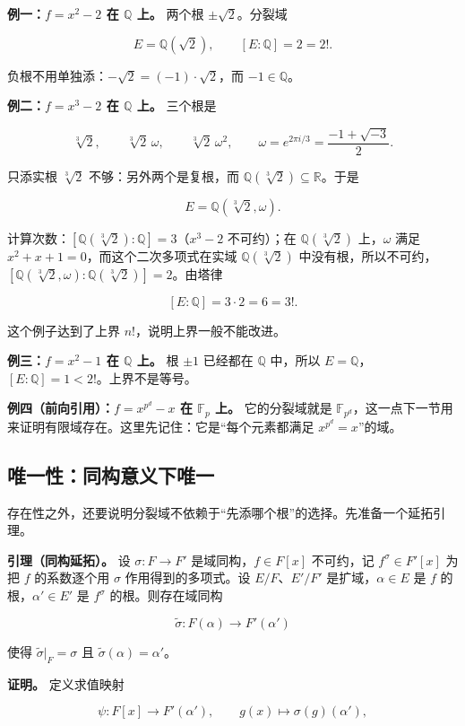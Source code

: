 \textbf{例一：$f=x^2-2$ 在 $\mathbb Q$ 上。} 两个根 $\pm\sqrt2$。分裂域

\[
E=\mathbb Q(\sqrt2),\qquad [E:\mathbb Q]=2=2! .
\]

负根不用单独添：$-\sqrt2=(-1)\cdot\sqrt2$，而 $-1\in\mathbb Q$。

\textbf{例二：$f=x^3-2$ 在 $\mathbb Q$ 上。} 三个根是

\[
\sqrt[3]{2},\qquad \sqrt[3]{2}\,\omega,\qquad \sqrt[3]{2}\,\omega^2,
\qquad \omega=e^{2\pi i/3}=\frac{-1+\sqrt{-3}}{2}.
\]

只添实根 $\sqrt[3]{2}$ 不够：另外两个是复根，而 $\mathbb Q(\sqrt[3]{2})\subseteq\mathbb R$。于是

\[
E=\mathbb Q(\sqrt[3]{2},\omega).
\]

计算次数：$[\mathbb Q(\sqrt[3]{2}):\mathbb Q]=3$（$x^3-2$ 不可约）；在 $\mathbb Q(\sqrt[3]{2})$ 上，$\omega$ 满足 $x^2+x+1=0$，而这个二次多项式在实域 $\mathbb Q(\sqrt[3]{2})$ 中没有根，所以不可约，$[\mathbb Q(\sqrt[3]{2},\omega):\mathbb Q(\sqrt[3]{2})]=2$。由塔律

\[
[E:\mathbb Q]=3\cdot2=6=3! .
\]

这个例子达到了上界 $n!$，说明上界一般不能改进。

\textbf{例三：$f=x^2-1$ 在 $\mathbb Q$ 上。} 根 $\pm1$ 已经都在 $\mathbb Q$ 中，所以 $E=\mathbb Q$，$[E:\mathbb Q]=1<2!$。上界不是等号。

\textbf{例四（前向引用）：$f=x^{p^d}-x$ 在 $\mathbb F_p$ 上。} 它的分裂域就是 $\mathbb F_{p^d}$，这一点下一节用来证明有限域存在。这里先记住：它是“每个元素都满足 $x^{p^d}=x$”的域。

\subsection{唯一性：同构意义下唯一}


存在性之外，还要说明分裂域不依赖于“先添哪个根”的选择。先准备一个延拓引理。

\textbf{引理（同构延拓）。} 设 $\sigma:F\to F'$ 是域同构，$f\in F[x]$ 不可约，记 $f^\sigma\in F'[x]$ 为把 $f$ 的系数逐个用 $\sigma$ 作用得到的多项式。设 $E/F$、$E'/F'$ 是扩域，$\alpha\in E$ 是 $f$ 的根，$\alpha'\in E'$ 是 $f^\sigma$ 的根。则存在域同构

\[
\tilde\sigma:F(\alpha)\longrightarrow F'(\alpha')
\]

使得 $\tilde\sigma|_F=\sigma$ 且 $\tilde\sigma(\alpha)=\alpha'$。

\textbf{证明。} 定义求值映射

\[
\psi:F[x]\longrightarrow F'(\alpha'),\qquad g(x)\longmapsto \sigma(g)(\alpha'),
\]

